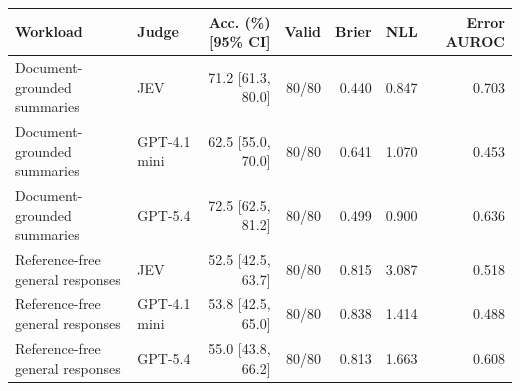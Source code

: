 \begin{tabular}{@{}llrrrrr@{}}
\toprule
Workload & Judge & Acc. (\%) [95\% CI] & Valid & Brier & NLL & Error AUROC \\
\midrule
Document-grounded summaries & JEV & 71.2 [61.3, 80.0] & 80/80 & 0.440 & 0.847 & 0.703 \\
Document-grounded summaries & GPT-4.1 mini & 62.5 [55.0, 70.0] & 80/80 & 0.641 & 1.070 & 0.453 \\
Document-grounded summaries & GPT-5.4 & 72.5 [62.5, 81.2] & 80/80 & 0.499 & 0.900 & 0.636 \\
Reference-free general responses & JEV & 52.5 [42.5, 63.7] & 80/80 & 0.815 & 3.087 & 0.518 \\
Reference-free general responses & GPT-4.1 mini & 53.8 [42.5, 65.0] & 80/80 & 0.838 & 1.414 & 0.488 \\
Reference-free general responses & GPT-5.4 & 55.0 [43.8, 66.2] & 80/80 & 0.813 & 1.663 & 0.608 \\
\bottomrule
\end{tabular}
